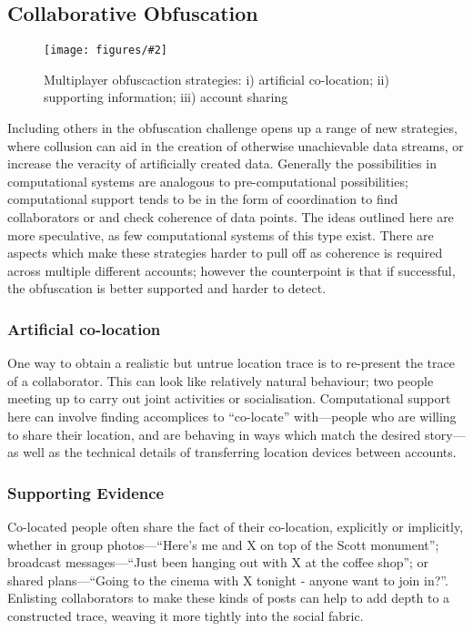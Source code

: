 \documentclass{IOS-Book-Article}     %
\newcommand{\fig}[3][0.9]{
\begin{figure}[tp]
\begin{center}
\texttt{[image: figures/\#2]}
\caption{#3}
\label{fig:#2}
\end{center}
\end{figure}
}
\newcommand{\tbox}[3][red]{{
\color{#1}\noindent{
   \fbox{\scriptsize{ {\bf #2} \textsl{#3}}}
   \vspace{2pt}
}
}}
\newcommand{\todo}[1]{\tbox{TODO:}{#1}}
\begin{document}
\subsection{Collaborative Obfuscation}
\fig{MultiPlayerObfuscation}{Multiplayer obfuscaction strategies: i) artificial
co-location; ii) supporting information; iii) account sharing}

Including others in the obfuscation challenge opens up a range of new 
strategies, where collusion can aid in the creation of otherwise unachievable
data streams, or increase the veracity of artificially created data. Generally
the possibilities in computational systems are analogous to pre-computational
possibilities; computational support tends to be in the form of coordination to
find collaborators or and check coherence of data points. The ideas outlined
here are more speculative, as few computational systems of this type exist.
There are aspects which make these strategies harder to pull off as coherence is
required across multiple different accounts; however the counterpoint is
that if successful, the obfuscation is better supported and harder to detect.

\subsubsection{Artificial co-location}
One way to obtain a realistic but untrue location trace is to re-present the
trace of a collaborator. This can look like relatively natural
behaviour; two people meeting up to carry out joint activities or socialisation.
Computational support here can involve finding accomplices to ``co-locate''
with---people who are willing to share their location, and are behaving in ways
which match the desired story---as well as the technical details of
transferring location devices between accounts.

\subsubsection{Supporting Evidence}

Co-located people often share the fact of their co-location, explicitly or
implicitly, whether in group photos---``Here's me and X on top of the Scott
monument''; broadcast messages---``Just been hanging out with X at the coffee
shop''; or shared plans---``Going to the cinema with X tonight - anyone want to
join in?''. Enlisting collaborators to make these kinds of posts can help to add depth to a
constructed trace, weaving it more tightly into the social fabric.
\end{document}
